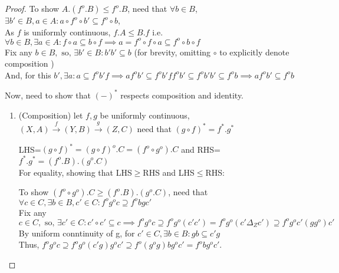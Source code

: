 \documentclass[18pt,a4paper]{article}
\theoremstyle{definition}
\begin{document}
\begin{proof}
		To show $A.(f^o .B) \leq f^o .B$, need that $\forall b \in B$,
		$\exists b' \in B, a\in A : a \circ f^o \circ b' \subseteq f^o \circ b$,\\
		As $f$ is uniformly continuous, $f.A\leq B.f$ i.e. $\forall b \in B, \exists a \in A
		: f \circ a \subseteq b \circ f
		\implies a= f^o \circ f \circ a \subseteq f^o \circ  b \circ f $   \\
		Fix any $b \in B, \text{ so, } \exists b' \in B : b'b' \subseteq b$
		(for brevity, omitting $\circ$ to explicitly denote composition  )\\
		And, for this $b', \exists a : a \subseteq f^ob'f \implies af^ob' \subseteq f^ob'ff^ob'
		\subseteq f^o b'b' \subseteq f^o b \implies af^ob' \subseteq f^o b$\\
	\item	Now, need to show that $(-)^*$ respects composition and identity.
		\begin{enumerate}[label=(\roman*)]
			\item (Composition) let $f,g$ be uniformly continuous,
				$(X,A) \xrightarrow{f} (Y,B) \xrightarrow{g} (Z,C)$
				need that $(g \circ f)^*= f^*.g^* $

				LHS=$(g \circ f)^*=(g \circ f)^o .C=(f^o \circ g^o).C$ and
				RHS=$f^*.g^* =(f^o .B).(g^o .C)$\\
				For equality, showing that LHS$\geq$RHS and LHS$\leq$RHS:

				To show $(f^o \circ g^o).C\geq(f^o .B).(g^o .C)$, need that
				$\forall c \in C, \exists b \in B, c' \in C : f^og^oc
				\supseteq f^obgc'$ \\
				Fix any $c \in C, \text{ so, } \exists c' \in C: c' \circ c' \subseteq c
				\implies f^o g^o c \supseteq f^o g^o (c'c')
				=f^o g^o (c' \Delta_Z c') \supseteq f^o g^o c'(gg^o)c'$ \\
				By uniform conntinuity of g, for $c'\in C,\exists b\in B: gb\subseteq c'g $
				\\Thus, $f^o g^o c \supseteq f^o g^o (c'g)g^oc' \supseteq
				f^o (g^o g)bg^o c'=f^o bg^o c'$.


\end{enumerate}
\end{proof}
\end{document}

